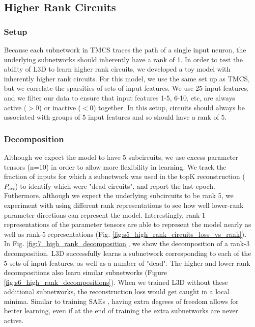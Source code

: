 \documentclass{article}
\theoremstyle{plain}
\theoremstyle{definition}
\theoremstyle{remark}
\begin{document}
\subsection{Higher Rank Circuits}

\subsubsection{Setup}
Because each subnetwork in TMCS traces the path of a single input neuron, the underlying subnetworks should inherently have a rank of 1. In order to test the ability of L3D to learn higher rank circuits, we developed a toy model with inherently higher rank circuits. For this model, we use the same set up as TMCS, but we correlate the sparsities of sets of input features. We use 25 input features, and we filter our data to ensure that input features 1-5, 6-10, etc, are always active ($>0$) or inactive ($<0$) together. In this setup, circuits should always be associated with groups of 5 input features and so should have a rank of 5.

\subsubsection{Decomposition}

Although we expect the model to have 5 subcircuits, we use excess parameter tensors (n=10) in order to allow more flexibility in learning. We track the fraction of inputs for which a subnetwork was used in the topK reconstruction ($P_{act}$) to identify which were "dead circuits", and report the last epoch. Futhermore, although we expect the underlying subcircuits to be rank 5, we experiment with using different rank representations to see how well lower-rank parameter directions can represent the model. Interestingly, rank-1 representations of the parameter tensors are able to represent the model nearly as well as rank-5 representations (Fig. \ref{fig:s5_high_rank_circuits_loss_vs_rank}). In Fig. \ref{fig:7_high_rank_decomposition}, we show the decomposition of a rank-3 decomposition. L3D successfully learns a subnetwork corresponding to each of the 5 sets of input features, as well as a number of "dead". The higher and lower rank decompositions also learn similar subnetworks (Figure \ref{fig:s6_high_rank_decompositions}). When we trained L3D without these additional subnetworks, the reconstruction loss would get caught in a local minima. Similar to training SAEs \cite{cunningham2023sparse}, having extra degrees of freedom allows for better learning, even if at the end of training the extra subnetworks are never active.
\end{document}
